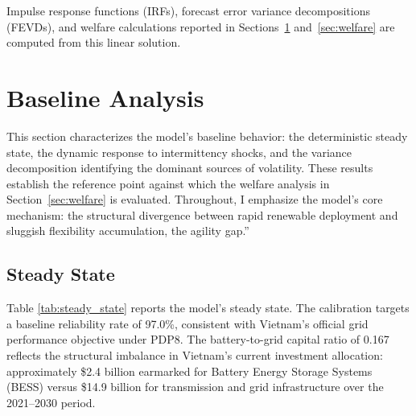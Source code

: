 \documentclass[12pt, a4paper]{article}
\begin{document}
	Impulse response functions (IRFs), forecast error variance decompositions (FEVDs), and welfare calculations reported in Sections~\ref{sec:results} and~\ref{sec:welfare} are computed from this linear solution.
	
	\section{Baseline Analysis} \label{sec:results}
	
	This section characterizes the model's baseline behavior: the deterministic steady state, the dynamic response to intermittency shocks, and the variance decomposition identifying the dominant sources of volatility. These results establish the reference point against which the welfare analysis in Section~\ref{sec:welfare} is evaluated. Throughout, I emphasize the model's core mechanism: the structural divergence between rapid renewable deployment and sluggish flexibility accumulation, the agility gap.''
	
	\subsection{Steady State}
	
	Table \ref{tab:steady_state} reports the model's steady state. The calibration targets a baseline reliability rate of 97.0\%, consistent with Vietnam's official grid performance objective under PDP8. The battery-to-grid capital ratio of 0.167 reflects the structural imbalance in Vietnam's current investment allocation: approximately \$2.4 billion earmarked for Battery Energy Storage Systems (BESS) versus \$14.9 billion for transmission and grid infrastructure over the 2021--2030 period.
	
\end{document}
